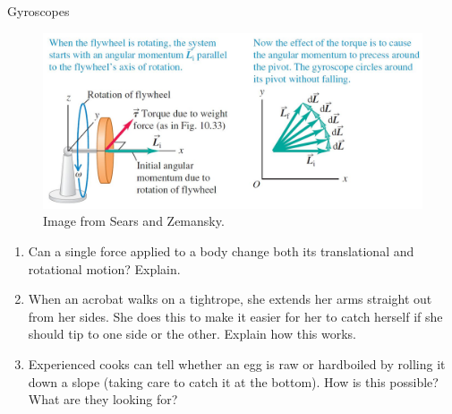 \documentclass[]{beamer}
\begin{document}
\begin{frame}

  Gyroscopes 

  \vspace{7mm}


   \begin{figure}[h!]  
    \includegraphics[width=1.2\textwidth]{images/14.jpg}
    \caption{Image from Sears and Zemansky.}
  \end{figure}
  
  \end{frame}






\begin{frame}

\begin{enumerate}
\item Can a single force applied to a body change both its translational
and rotational motion? Explain.
\pause
\item When an acrobat walks on a tightrope, she extends her arms
straight out from her sides. She does this to make it easier for her
to catch herself if she should tip to one side or the other. Explain
how this works.
\pause

\item Experienced cooks can tell whether an egg is raw or hardboiled
by rolling it down a slope (taking care to catch it at the bottom).
How is this possible? What are they looking for?



\end{enumerate}
  
  \end{frame}


\end{document}
